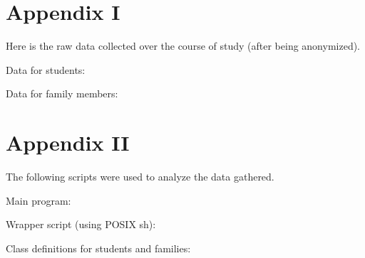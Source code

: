 \documentclass[12pt]{report}
\begin{document}
\chapter*{Appendix I}
Here is the raw data collected over the course of study (after being anonymized).

Data for students:


Data for family members:


\chapter*{Appendix II}
The following scripts were used to analyze the data gathered.

Main program:



Wrapper script (using POSIX sh):



Class definitions for students and families:


\end{document}
